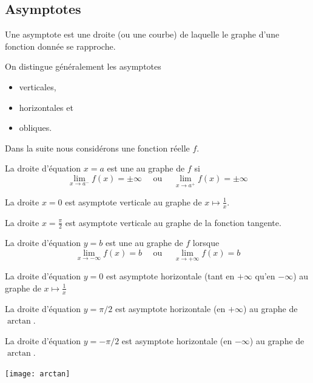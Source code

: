 \subsection{Asymptotes}
\begin{frame}
  \begin{definition}
    Une asymptote est une droite (ou une courbe) de laquelle le graphe d'une fonction donnée se rapproche.
  \end{definition}
  On distingue généralement les asymptotes
  \begin{itemize}
  \item \og verticales\fg{},
  \item \og horizontales\fg{} et
  \item \og obliques\fg{}.
  \end{itemize}
  
  Dans la suite nous considérons une fonction réelle $f$.
\end{frame}

\begin{frame}
  \begin{definition}
    La droite d'équation $x=a$ est une  au graphe de $f$ si
    \begin{equation*}
      \lim_{x \to a^-} f(x) = \pm \infty \quad \textrm{ ou } \quad \lim_{x \to a^+} f(x) = \pm \infty
    \end{equation*}
  \end{definition}
  \begin{example}
    La droite \(x = 0\) est asymptote verticale au graphe de \(x \mapsto \frac{1}{x}\).\pause

    La droite \(x = \frac{\pi}{2}\) est asymptote verticale au graphe de la fonction tangente.
  \end{example}
\end{frame}

\begin{frame}
  \begin{definition}
    La droite d'équation $y=b$ est une  au graphe de $f$ lorsque
    \begin{equation*}
      \lim_{x \to - \infty} f(x) = b \quad \mbox{ ou } \quad \lim_{x \to +\infty} f(x) = b
    \end{equation*}
  \end{definition}
  \begin{example}
    La droite d'équation \(y = 0\) est asymptote horizontale (tant en \(+\infty\) qu'en \(-\infty\)) au graphe de \(x \mapsto \frac{1}{x}\)\pause

    La droite d'équation \(y = \pi/2\) est asymptote horizontale (en \(+\infty\)) au graphe de \(\arctan\).\pause

    La droite d'équation \(y = -\pi/2\) est asymptote horizontale (en \(-\infty\)) au graphe de \(\arctan\).
  \end{example}
\end{frame}
\begin{frame}
  \begin{example}
    \texttt{[image: arctan]}
  \end{example}
\end{frame}

